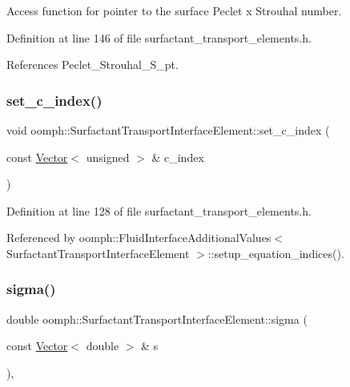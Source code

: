 Access function for pointer to the surface Peclet x Strouhal number. 



Definition at line 146 of file surfactant\+\_\+transport\+\_\+elements.\+h.



References Peclet\+\_\+\+Strouhal\+\_\+\+S\+\_\+pt.

\mbox{\label{classoomph_1_1SurfactantTransportInterfaceElement_aaf7988dfac3e02018c591f2f9e34f644}} 
\subsubsection{\texorpdfstring{set\+\_\+c\+\_\+index()}{set\_c\_index()}}
{\footnotesize\ttfamily void oomph\+::\+Surfactant\+Transport\+Interface\+Element\+::set\+\_\+c\+\_\+index (\begin{DoxyParamCaption}\item[{const \hyperlink{classoomph_1_1Vector}{Vector}$<$ unsigned $>$ \&}]{c\+\_\+index }\end{DoxyParamCaption})\hspace{0.3cm}{\ttfamily [inline]}}



Definition at line 128 of file surfactant\+\_\+transport\+\_\+elements.\+h.



Referenced by oomph\+::\+Fluid\+Interface\+Additional\+Values$<$ Surfactant\+Transport\+Interface\+Element $>$\+::setup\+\_\+equation\+\_\+indices().

\mbox{\label{classoomph_1_1SurfactantTransportInterfaceElement_a1710057c610ccccc06ef41f34f086aae}} 
\subsubsection{\texorpdfstring{sigma()}{sigma()}}
{\footnotesize\ttfamily double oomph\+::\+Surfactant\+Transport\+Interface\+Element\+::sigma (\begin{DoxyParamCaption}\item[{const \hyperlink{classoomph_1_1Vector}{Vector}$<$ double $>$ \&}]{s }\end{DoxyParamCaption})\hspace{0.3cm}{\ttfamily [protected]}, {\ttfamily [virtual]}}


